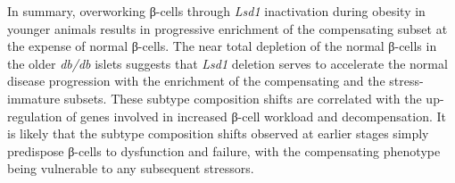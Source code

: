In summary, overworking β-cells through \textit{Lsd1} inactivation during obesity in younger animals results in progressive enrichment of the compensating subset at the expense of normal β-cells. The near total depletion of the normal β-cells in the older \textit{db/db} islets suggests that \textit{Lsd1} deletion serves to accelerate the normal disease progression with the enrichment of the compensating and the stress-immature subsets. These subtype composition shifts are correlated with the up-regulation of genes involved in increased β-cell workload and decompensation. It is likely that the subtype composition shifts observed at earlier stages simply predispose β-cells to dysfunction and failure, with the compensating phenotype being vulnerable to any subsequent stressors.


